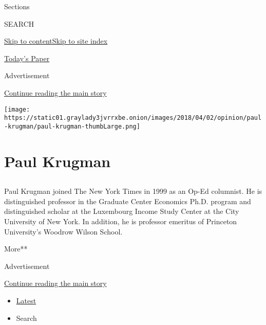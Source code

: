 Sections

SEARCH

\protect\hyperlink{site-content}{Skip to
content}\protect\hyperlink{site-index}{Skip to site index}

\href{https://myaccount.nytimes3xbfgragh.onion/auth/login?response_type=cookie\&client_id=vi}{}

\href{https://www.nytimes3xbfgragh.onion/section/todayspaper}{Today's
Paper}

Advertisement

\protect\hyperlink{after-top}{Continue reading the main story}

\texttt{[image: https://static01.graylady3jvrrxbe.onion/images/2018/04/02/opinion/paul-krugman/paul-krugman-thumbLarge.png]}

\hypertarget{paul-krugman}{%
\section{Paul Krugman}\label{paul-krugman}}

\subsection{}

Paul Krugman joined The New York Times in 1999 as an Op-Ed columnist. He
is distinguished professor in the Graduate Center Economics Ph.D.
program and distinguished scholar at the Luxembourg Income Study Center
at the City University of New York. In addition, he is professor
emeritus of Princeton University's Woodrow Wilson School.

More**

Advertisement

\protect\hyperlink{after-mid1}{Continue reading the main story}

\begin{itemize}
\tightlist
\item
  \protect\hyperlink{stream-panel}{Latest}
\item
  Search
\end{itemize}

